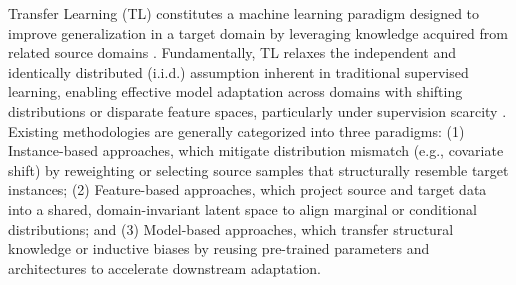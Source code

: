 \documentclass[lettersize,journal]{IEEEtran}
\begin{document}

Transfer Learning (TL) constitutes a machine learning paradigm designed to improve generalization in a target domain by leveraging knowledge acquired from related source domains \cite{weiss2016survey,zhuang2020comprehensive}. Fundamentally, TL relaxes the independent and identically distributed (i.i.d.) assumption inherent in traditional supervised learning, enabling effective model adaptation across domains with shifting distributions or disparate feature spaces, particularly under supervision scarcity \cite{DBLP:journals/tkde/PanY10}. Existing methodologies are generally categorized into three paradigms: (1) Instance-based approaches, which mitigate distribution mismatch (e.g., covariate shift) by reweighting or selecting source samples that structurally resemble target instances; (2) Feature-based approaches, which project source and target data into a shared, domain-invariant latent space to align marginal or conditional distributions; and (3) Model-based approaches, which transfer structural knowledge or inductive biases by reusing pre-trained parameters and architectures to accelerate downstream adaptation.
\end{document}
